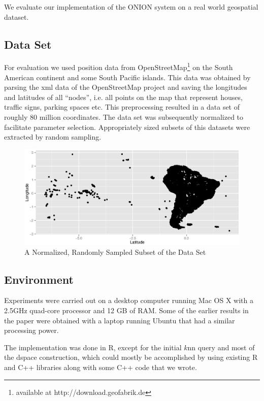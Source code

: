 \documentclass[runningheads]{llncs}
\begin{document}
We evaluate our implementation of the ONION system on a real world geospatial dataset.

\subsection{Data Set}
For evaluation we used position data from OpenStreetMap\footnote{available at http://download.geofabrik.de} on the South American continent and some South Pacific islands. This data was obtained by parsing the xml data of the OpenStreetMap project and saving the longitudes and latitudes of all ``nodes'', i.e. all points on the map that represent houses, traffic signs, parking spaces etc. This preprocessing resulted in a data set of roughly 80 million coordinates. The data set was subsequently normalized to facilitate parameter selection. Appropriately sized subsets of this datasets were extracted by random sampling.
\begin{figure}[H]
\caption{A Normalized, Randomly Sampled Subset of the Data Set}
\includegraphics[width=.68\textwidth]{images/south-america-osm.eps}
\end{figure}
\subsection{Environment}
Experiments were carried out on a desktop computer running Mac OS X with a 2.5GHz quad-core processor and 12 GB of RAM. Some of the earlier results in the paper were obtained with a laptop running Ubuntu that had a similar processing power. 

The implementation was done in R, except for the initial $k$nn query and most of the dspace construction, which could mostly be accomplished by using existing R and C++ libraries along with some C++ code that we wrote.
\end{document}
